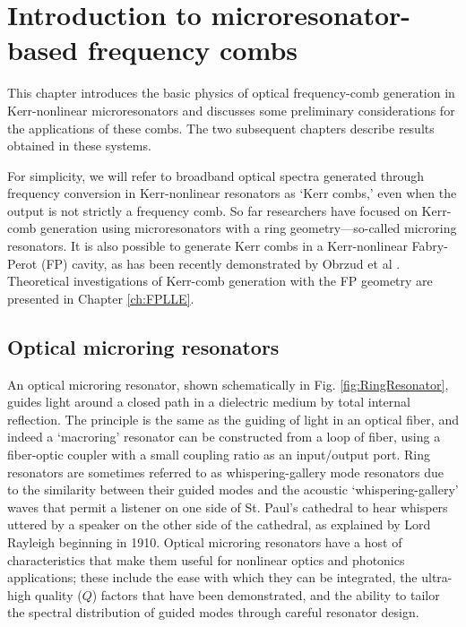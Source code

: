 \chapter{Introduction to microresonator-based frequency combs}
 \label{ch:microresonators}
 
 This chapter introduces the basic physics of optical frequency-comb generation in Kerr-nonlinear microresonators and discusses some preliminary considerations for the applications of these combs. The two  subsequent chapters describe results obtained in these systems. 
 
 For simplicity, we will refer to broadband optical spectra generated through frequency conversion in Kerr-nonlinear resonators as `Kerr combs,' even when the output is not strictly a frequency comb. So far researchers have focused on Kerr-comb generation using microresonators with a ring geometry---so-called microring resonators. It is also possible to generate Kerr combs in a Kerr-nonlinear Fabry-Perot (FP) cavity, as has been recently demonstrated by Obrzud et al \cite{Obrzud2018}. Theoretical investigations of Kerr-comb generation with the FP geometry are presented in Chapter \ref{ch:FPLLE}.
 

 
 \section{Optical microring resonators}
An optical microring resonator, shown schematically in Fig. \ref{fig:RingResonator}, guides light around a closed path in a dielectric medium by total internal reflection. The principle is the same as the guiding of light in an optical fiber, and indeed a `macroring' resonator can be constructed from a loop of fiber, using a fiber-optic coupler with a small coupling ratio as an input/output port. Ring resonators are sometimes referred to as whispering-gallery mode resonators due to the similarity between their guided modes and the acoustic `whispering-gallery' waves that permit a listener on one side of St. Paul's cathedral to hear whispers uttered by a speaker on the other side of the cathedral, as explained by Lord Rayleigh beginning in 1910. Optical microring resonators have a host of characteristics that make them useful for nonlinear optics and photonics applications; these include the ease with which they can be integrated, the ultra-high quality ($Q$) factors that have been demonstrated, and the ability to tailor the spectral distribution of guided modes through careful resonator design.  


